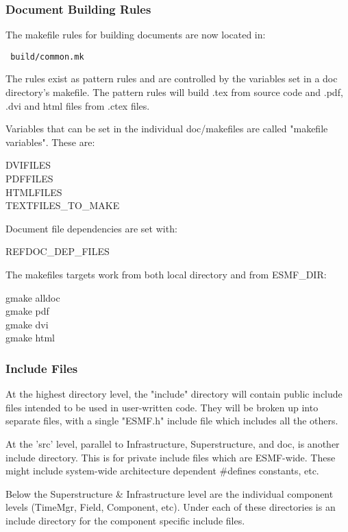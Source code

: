 \subsubsection{Document Building Rules} 
The makefile rules for building documents are now located in:
\begin{verbatim} build/common.mk \end{verbatim} 
The rules exist
as pattern rules and are controlled by the variables set in a doc
directory's makefile.  The pattern rules will build .tex  from source code
and .pdf, .dvi and html files from .ctex files.

Variables that can be set in the individual doc/makefiles are called
"makefile variables".  These are: 
\begin{description} 
\item [DVIFILES]
\item [PDFFILES] 
\item [HTMLFILES] 
\item [TEXTFILES\_TO\_MAKE]
\end{description}

Document file dependencies are set with: 
\begin{description} 
\item [REFDOC\_DEP\_FILES]
\end{description}

The makefiles targets work from both local directory and from ESMF\_DIR:
\begin{description} 
\item [gmake alldoc] 
\item [gmake pdf] 
\item [gmake dvi] 
\item [gmake html] 
\end{description}


\subsubsection{Include Files} 
At the highest directory level, the "include"
directory will contain public include files intended to be used in
user-written code.  They will be broken up into separate files, with a
single "ESMF.h" include file which includes all the others.

At the 'src' level, parallel to Infrastructure, Superstructure, and doc,
is another include directory.  This is for private include files which are
ESMF-wide.  These might include system-wide architecture dependent
\#defines constants, etc.

Below the Superstructure \& Infrastructure level are the individual
component levels (TimeMgr, Field, Component, etc).  Under each of these
directories is an include directory for the component specific include
files.

